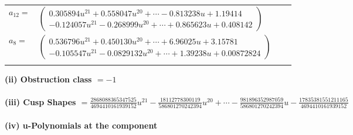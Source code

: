 \documentclass[1p]{elsarticle_modified}
\theoremstyle{definition}
\begin{document}
\begin{tabular}{m{7pt} m{180pt} m{7pt} m{180pt} }
\flushright $a_{12}=$&$\begin{pmatrix}0.305894 u^{21}+0.558047 u^{20}+\cdots-0.813238 u+1.19414\\-0.124057 u^{21}-0.268999 u^{20}+\cdots+0.865623 u+0.408142\end{pmatrix}$ \\
\flushright $a_{8}=$&$\begin{pmatrix}0.536796 u^{21}+0.450130 u^{20}+\cdots+6.96025 u+3.15781\\-0.105547 u^{21}-0.0829132 u^{20}+\cdots+1.39238 u+0.00872824\end{pmatrix}$\\&\end{tabular}
\flushleft \textbf{(ii) Obstruction class $= -1$}\\~\\
\flushleft \textbf{(iii) Cusp Shapes $= \frac{2868088365347525}{4694410161939152} u^{21}-\frac{18112778300119}{586801270242394} u^{20}+\cdots-\frac{981896352987059}{586801270242394} u-\frac{17835381551211165}{4694410161939152}$}\\~\\
\newpage\renewcommand{\arraystretch}{1}
\flushleft \textbf{(iv) u-Polynomials at the component}\newline \\
\end{document}
